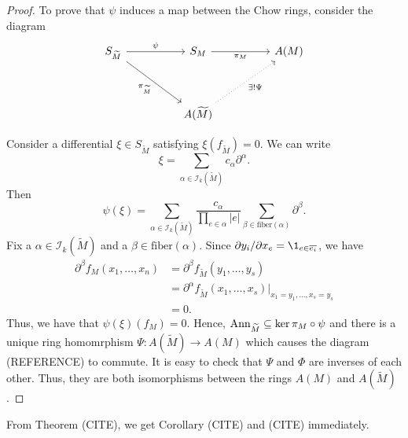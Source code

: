 \documentclass{puthesis-UG}
\begin{document}
\begin{proof}
To prove that $\psi$ induces a map between the Chow rings, consider the diagram
\[\begin{tikzcd}
	{S_{\widetilde{M}}} && {S_M} && {A(M)} \\
	\\
	&& {A(\widetilde{M})}
	\arrow["{\pi_{\widetilde{M}}}"', from=1-1, to=3-3]
	\arrow["\psi", from=1-1, to=1-3]
	\arrow["{\pi_M}"', from=1-3, to=1-5]
	\arrow["{\exists! \Psi}"', dotted, from=3-3, to=1-5]
\end{tikzcd}\]

Consider a differential $\xi \in S_{\widetilde{M}}$ satisfying $\xi(f_{\widetilde{M}}) = 0$. We can write 
\[
	\xi = \sum_{\alpha \in \mathcal{I}_k (\widetilde{M})} c_\alpha \partial^\alpha.
\]
Then
\[
	\psi(\xi) = \sum_{\alpha \in \mathcal{I}_k (\widetilde{M})} \frac{c_\alpha}{\prod_{e \in \alpha} |e|}\sum_{\beta \in \text{fiber}(\alpha)} \partial^\beta.
\]
Fix a $\alpha \in \mathcal{I}_k(\widetilde{M})$ and a $\beta \in \text{fiber}(\alpha)$. Since $\partial y_i / \partial x_e = \1_{e \in \overline{e_i}}$, we have  
\begin{align*}
	\partial^\beta f_M (x_1, \ldots, x_n) & = \partial^\beta f_{\widetilde{M}} (y_1, \ldots, y_s) \\
	& = \partial^\alpha f_{\widetilde{M}} (x_1, \ldots, x_s) |_{x_1 = y_1, \ldots, x_s = y_s} \\
	& = 0.
\end{align*}
Thus, we have that $\psi (\xi)(f_M) = 0$. Hence, $\operatorname{Ann}_{\widetilde{M}} \subseteq \ker \pi_M \circ \psi$ and there is a unique ring homomrphism $\Psi : A(\widetilde{M}) \to A(M)$ which causes the diagram (REFERENCE) to commute. It is easy to check that $\Psi$ and $\Phi$ are inverses of each other. Thus, they are both isomorphisms between the rings $A(M)$ and $A(\widetilde{M})$. 
\end{proof}

From Theorem (CITE), we get Corollary (CITE) and (CITE) immediately.  
\end{document}
